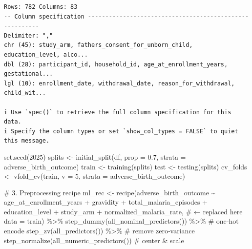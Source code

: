 \documentclass[
  letterpaper,
  DIV=11,
  numbers=noendperiod]{scrartcl}
\newenvironment{Shaded}{}{}
\newcommand{\AttributeTok}[1]{\textcolor[rgb]{0.84,0.23,0.29}{#1}}
\newcommand{\CommentTok}[1]{\textcolor[rgb]{0.42,0.45,0.49}{#1}}
\newcommand{\DecValTok}[1]{\textcolor[rgb]{0.00,0.36,0.77}{#1}}
\newcommand{\FloatTok}[1]{\textcolor[rgb]{0.00,0.36,0.77}{#1}}
\newcommand{\FunctionTok}[1]{\textcolor[rgb]{0.44,0.26,0.76}{#1}}
\newcommand{\NormalTok}[1]{\textcolor[rgb]{0.14,0.16,0.18}{#1}}
\newcommand{\OtherTok}[1]{\textcolor[rgb]{0.44,0.26,0.76}{#1}}
\newcommand{\SpecialCharTok}[1]{\textcolor[rgb]{0.00,0.36,0.77}{#1}}
\begin{document}
\begin{verbatim}
Rows: 782 Columns: 83
-- Column specification --------------------------------------------------------
Delimiter: ","
chr (45): study_arm, fathers_consent_for_unborn_child, education_level, alco...
dbl (28): participant_id, household_id, age_at_enrollment_years, gestational...
lgl (10): enrollment_date, withdrawal_date, reason_for_withdrawal, child_wit...

i Use `spec()` to retrieve the full column specification for this data.
i Specify the column types or set `show_col_types = FALSE` to quiet this message.
\end{verbatim}

\begin{Shaded}
\begin{Highlighting}[]
\FunctionTok{set.seed}\NormalTok{(}\DecValTok{2025}\NormalTok{)}
\NormalTok{splits    }\OtherTok{\textless{}{-}} \FunctionTok{initial\_split}\NormalTok{(df, }\AttributeTok{prop =} \FloatTok{0.7}\NormalTok{, }\AttributeTok{strata =}\NormalTok{ adverse\_birth\_outcome)}
\NormalTok{train     }\OtherTok{\textless{}{-}} \FunctionTok{training}\NormalTok{(splits)}
\NormalTok{test      }\OtherTok{\textless{}{-}} \FunctionTok{testing}\NormalTok{(splits)}
\NormalTok{cv\_folds  }\OtherTok{\textless{}{-}} \FunctionTok{vfold\_cv}\NormalTok{(train, }\AttributeTok{v =} \DecValTok{5}\NormalTok{, }\AttributeTok{strata =}\NormalTok{ adverse\_birth\_outcome)}

\CommentTok{\# 3. Preprocessing recipe}
\NormalTok{ml\_rec }\OtherTok{\textless{}{-}} \FunctionTok{recipe}\NormalTok{(adverse\_birth\_outcome }\SpecialCharTok{\textasciitilde{}} 
\NormalTok{                   age\_at\_enrollment\_years }\SpecialCharTok{+}
\NormalTok{                   gravidity }\SpecialCharTok{+}
\NormalTok{                   total\_malaria\_episodes }\SpecialCharTok{+}
\NormalTok{                   education\_level }\SpecialCharTok{+}
\NormalTok{                   study\_arm }\SpecialCharTok{+}
\NormalTok{                   normalized\_malaria\_rate,   }\CommentTok{\# ← replaced here}
                 \AttributeTok{data =}\NormalTok{ train) }\SpecialCharTok{\%\textgreater{}\%}
  \FunctionTok{step\_dummy}\NormalTok{(}\FunctionTok{all\_nominal\_predictors}\NormalTok{()) }\SpecialCharTok{\%\textgreater{}\%}  \CommentTok{\# one‐hot encode}
  \FunctionTok{step\_zv}\NormalTok{(}\FunctionTok{all\_predictors}\NormalTok{()) }\SpecialCharTok{\%\textgreater{}\%}             \CommentTok{\# remove zero‐variance}
  \FunctionTok{step\_normalize}\NormalTok{(}\FunctionTok{all\_numeric\_predictors}\NormalTok{())  }\CommentTok{\# center \& scale}


\end{Highlighting}
\end{Shaded}
\end{document}
